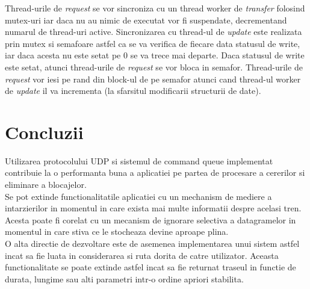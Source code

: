 \documentclass[runningheads]{llncs}
\begin{document}
Thread-urile de \textit{request} se vor sincroniza cu un thread worker de \textit{transfer} folosind mutex-uri iar daca nu au nimic de executat vor fi suspendate, decrementand numarul de thread-uri active. Sincronizarea cu thread-ul de \textit{update} este realizata prin mutex si semafoare astfel ca se va verifica de fiecare data statusul de write, iar daca acesta nu este setat pe 0 se va trece mai departe. Daca statusul de write este setat, atunci thread-urile de \textit{request} se vor bloca in semafor. Thread-urile de \textit{request} vor iesi pe rand din block-ul de pe semafor atunci cand thread-ul worker de \textit{update} il va incrementa (la sfarsitul modificarii structurii de date).

\section{Concluzii}

\indent Utilizarea protocolului UDP si sistemul de command queue implementat contribuie la o performanta buna a aplicatiei pe partea de procesare a cererilor si eliminare a blocajelor. \\
\indent Se pot extinde functionalitatile aplicatiei cu un mechanism de mediere a intarzierilor in momentul in care exista mai multe informatii despre acelasi tren. Acesta poate fi corelat cu un mecanism de ignorare selectiva a datagramelor in momentul in care stiva ce le stocheaza devine aproape plina. \\
\indent O alta directie de dezvoltare este de asemenea implementarea unui sistem astfel incat sa fie luata in considerarea si ruta dorita de catre utilizator. Aceasta functionalitate se poate extinde astfel incat sa fie returnat traseul in functie de durata, lungime sau alti parametri intr-o ordine apriori stabilita.
\end{document}
